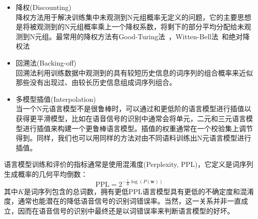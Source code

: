 \begin{itemize}
    \item 降权(Discounting) \\
    降权方法用于解决训练集中未观测到N元组概率无定义的问题，它的主要思想是将被观测到的N元组概率乘上一个降权系数，将剩下的部分平均分配给未观测到N元组。最常用的降权方法有Good-Turing法~\cite{good1953population,katz1987estimation}，Witten-Bell法~\cite{witten1991zero}和绝对降权法~\cite{ney1995estimation}
    \item 回溯法(Backing-off) \\
    回溯法利用训练数据中观测到的具有较短历史信息的词序列的组合概率来近似那些没有出现过、由较长历史信息组成词序列组合。
    \item 多模型插值(Interpolation) \\
    当一个N元语言模型不是很鲁棒时，可以通过和更低阶的语言模型进行插值以获得更平滑模型，比如在语音信号的识别中通常会将单元，二元和三元语言模型进行插值来构建一个更鲁棒语言模型。插值的权重通常在一个校验集上调节得到。同样，我们也可以用同样的方法对由不同语料训练出N元语言模型进行插值。
\end{itemize}
语言模型训练和评价的指标通常是使用混淆度(Perplexity, PPL)，它定义是词序列生成概率的几何平均倒数：
\begin{equation}
    \text{PPL}=2^{-\frac{1}{K}\log(P(\mathbf{w}))}
\end{equation}
其中$K$是词序列包含的总词数，拥有更低PPL语言模型具有更低的不确定度和混淆度，通常也能潜在的降低语音信号的识别词错误率。当然，这一关系并非一直成立，因而在语音信号的识别中最终还是以词错误率来判断语言模型的好坏。

